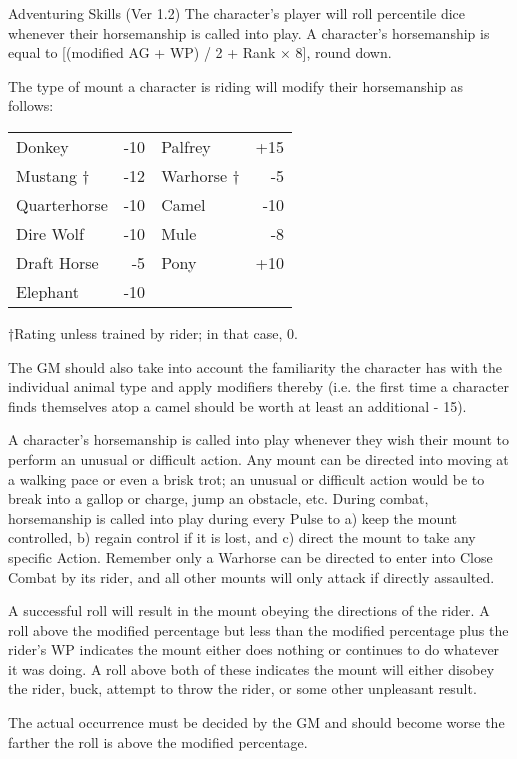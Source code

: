 \begin{Chapter}{Adventuring Skills (Ver 1.2)}
The character’s player will roll percentile dice whenever their
horsemanship is called into play. A character’s horsemanship is equal
to [(modified AG + WP) / 2 + Rank × 8], round down.

The type of mount a character is riding will modify 
their horsemanship as follows: 

\begin{tabularx}{\columnwidth}{XrXr} \\
Donkey		& -10	& Palfrey	& +15 \\
Mustang †	& -12	& Warhorse †	& -5 \\
Quarterhorse	& -10	& Camel		& -10 \\
Dire Wolf	& -10	& Mule		& -8 \\
Draft Horse	& -5	& Pony		& +10 \\
Elephant	& -10	& 		& \\
\end{tabularx}

†Rating unless trained by rider; in that case, 0. 

The GM should also take into account the familiarity the character has
with the individual animal type and apply modifiers thereby (i.e. the
first time a character finds themselves atop a camel should be worth
at least an additional - 15).

A character’s horsemanship is called into play whenever they wish
their mount to perform an unusual or difficult action.  Any mount can
be directed into moving at a walking pace or even a brisk trot; an
unusual or difficult action would be to break into a gallop or charge,
jump an obstacle, etc.  During combat, horsemanship is called into
play during every Pulse to a) keep the mount controlled, b) regain
control if it is lost, and c) direct the mount to take any specific
Action.  Remember only a Warhorse can be directed to enter into Close
Combat by its rider, and all other mounts will only attack if directly
assaulted.

A successful roll will result in the mount obeying the directions of
the rider.  A roll above the modified percentage but less than the
modified percentage plus the rider’s WP indicates the mount either
does nothing or continues to do whatever it was doing.  A roll above
both of these indicates the mount will either disobey the rider, buck,
attempt to throw the rider, or some other unpleasant result.

The actual occurrence must be decided by the GM and should become
worse the farther the roll is above the modified percentage.


\end{Chapter}
